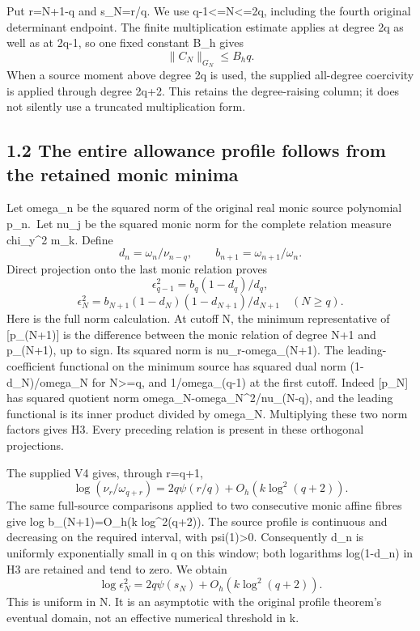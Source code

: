 \documentclass[11pt]{article}
\begin{document}
Put r=N+1-q and s\_N=r/q. We use q-1\textless=N\textless=2q, including the fourth original determinant endpoint. The finite multiplication estimate applies at degree 2q as well as at 2q-1, so one fixed constant B\_h gives \[
 \|C_N\|_{G_N}\le B_hq.
 \tag{H2}
\] When a source moment above degree 2q is used, the supplied all-degree coercivity is applied through degree 2q+2. This retains the degree-raising column; it does not silently use a truncated multiplication form.

\subsection{1.2 The entire allowance profile follows from the retained monic minima}\label{the-entire-allowance-profile-follows-from-the-retained-monic-minima}

Let omega\_n be the squared norm of the original real monic source polynomial p\_n.~Let nu\_j be the squared monic norm for the complete relation measure chi\_y\^{}2 m\_k. Define \[
 d_n=\omega_n/\nu_{n-q},\qquad b_{n+1}=\omega_{n+1}/\omega_n.
\] Direct projection onto the last monic relation proves \[
 \epsilon_{q-1}^2=b_q(1-d_q)/d_q,
\] \[
 \epsilon_N^2=b_{N+1}(1-d_N)(1-d_{N+1})/d_{N+1}\quad(N\ge q).
 \tag{H3}
\] Here is the full norm calculation. At cutoff N, the minimum representative of {[}p\_(N+1){]} is the difference between the monic relation of degree N+1 and p\_(N+1), up to sign. Its squared norm is nu\_r-omega\_(N+1). The leading-coefficient functional on the minimum source has squared dual norm (1-d\_N)/omega\_N for N\textgreater=q, and 1/omega\_(q-1) at the first cutoff. Indeed {[}p\_N{]} has squared quotient norm omega\_N-omega\_N\^{}2/nu\_(N-q), and the leading functional is its inner product divided by omega\_N. Multiplying these two norm factors gives H3. Every preceding relation is present in these orthogonal projections.

The supplied V4 gives, through r=q+1, \[
 \log(\nu_r/\omega_{q+r})=2q\psi(r/q)+O_h(k\log^2(q+2)).
 \tag{H4}
\] The same full-source comparisons applied to two consecutive monic affine fibres give log b\_(N+1)=O\_h(k log\^{}2(q+2)). The source profile is continuous and decreasing on the required interval, with psi(1)\textgreater0. Consequently d\_n is uniformly exponentially small in q on this window; both logarithms log(1-d\_n) in H3 are retained and tend to zero. We obtain \[
 \boxed{\log\epsilon_N^2=2q\psi(s_N)+O_h(k\log^2(q+2)).}
 \tag{H5}
\] This is uniform in N. It is an asymptotic with the original profile theorem's eventual domain, not an effective numerical threshold in k.
\end{document}
